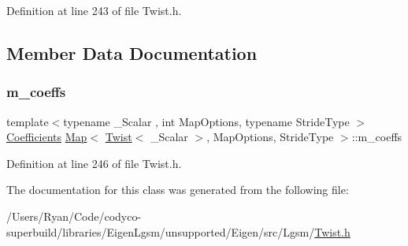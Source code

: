 Definition at line 243 of file Twist.\+h.



\subsection{Member Data Documentation}
\hypertarget{class_map_3_01_twist_3_01___scalar_01_4_00_01_map_options_00_01_stride_type_01_4_a393cb065b2aa091a7a5b5c66eca9861a}{}\label{class_map_3_01_twist_3_01___scalar_01_4_00_01_map_options_00_01_stride_type_01_4_a393cb065b2aa091a7a5b5c66eca9861a} 
\subsubsection{\texorpdfstring{m\+\_\+coeffs}{m\_coeffs}}
{\footnotesize\ttfamily template$<$typename \+\_\+\+Scalar , int Map\+Options, typename Stride\+Type $>$ \\
\hyperlink{class_map_3_01_twist_3_01___scalar_01_4_00_01_map_options_00_01_stride_type_01_4_aed5862495c86340dcb689412d79eb66a}{Coefficients} \hyperlink{class_map_3_01_twist_3_01___scalar_01_4_00_01_map_options_00_01_stride_type_01_4_a7bc49d9365cdda555f4d107d55a1c6b2}{Map}$<$ \hyperlink{class_twist}{Twist}$<$ \+\_\+\+Scalar $>$, Map\+Options, Stride\+Type $>$\+::m\+\_\+coeffs\hspace{0.3cm}{\ttfamily [protected]}}



Definition at line 246 of file Twist.\+h.



The documentation for this class was generated from the following file\+:\begin{DoxyCompactItemize}
\item 
/\+Users/\+Ryan/\+Code/codyco-\/superbuild/libraries/\+Eigen\+Lgsm/unsupported/\+Eigen/src/\+Lgsm/\hyperlink{_twist_8h}{Twist.\+h}\end{DoxyCompactItemize}
